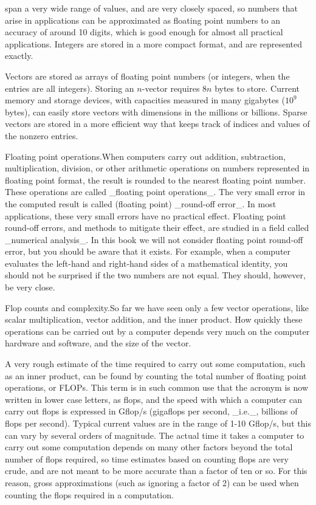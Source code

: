 span a very wide range of values, and are very closely spaced, so numbers that arise in applications can be approximated as floating point numbers to an accuracy of around 10 digits, which is good enough for almost all practical applications. Integers are stored in a more compact format, and are represented exactly.

Vectors are stored as arrays of floating point numbers (or integers, when the entries are all integers). Storing an \(n\)-vector requires \(8n\) bytes to store. Current memory and storage devices, with capacities measured in many gigabytes (\(10^{9}\) bytes), can easily store vectors with dimensions in the millions or billions. Sparse vectors are stored in a more efficient way that keeps track of indices and values of the nonzero entries.

Floating point operations.When computers carry out addition, subtraction, multiplication, division, or other arithmetic operations on numbers represented in floating point format, the result is rounded to the nearest floating point number. These operations are called _floating point operations_. The very small error in the computed result is called (floating point) _round-off error_. In most applications, these very small errors have no practical effect. Floating point round-off errors, and methods to mitigate their effect, are studied in a field called _numerical analysis_. In this book we will not consider floating point round-off error, but you should be aware that it exists. For example, when a computer evaluates the left-hand and right-hand sides of a mathematical identity, you should not be surprised if the two numbers are not equal. They should, however, be very close.

Flop counts and complexity.So far we have seen only a few vector operations, like scalar multiplication, vector addition, and the inner product. How quickly these operations can be carried out by a computer depends very much on the computer hardware and software, and the size of the vector.

A very rough estimate of the time required to carry out some computation, such as an inner product, can be found by counting the total number of floating point operations, or FLOPs. This term is in such common use that the acronym is now written in lower case letters, as flops, and the speed with which a computer can carry out flops is expressed in Gflop/s (gigaflops per second, _i.e._, billions of flops per second). Typical current values are in the range of 1-10 Gflop/s, but this can vary by several orders of magnitude. The actual time it takes a computer to carry out some computation depends on many other factors beyond the total number of flops required, so time estimates based on counting flops are very crude, and are not meant to be more accurate than a factor of ten or so. For this reason, gross approximations (such as ignoring a factor of 2) can be used when counting the flops required in a computation.

